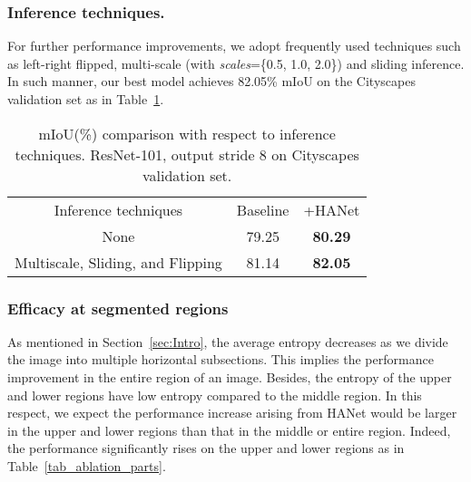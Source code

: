 \documentclass[10pt,twocolumn,letterpaper]{article}
\newcommand{\drule}{\specialrule{0.2pt}{1pt}{1pt}\specialrule{0.2pt}{0pt}{\belowrulesep}}
\begin{document}
\vspace*{-0.1cm}
\subsubsection{Inference techniques.} \label{exp_inference}
\vspace*{-0.2cm}
For further performance improvements, we adopt frequently used techniques such as left-right flipped, multi-scale (with \textit{scales}=\{0.5, 1.0, 2.0\}) and sliding inference.
In such manner, our best model achieves 82.05\% mIoU on the Cityscapes validation set as in Table~\ref{tab_best_model}.

\begin{table}[h]
\vspace*{-0.2cm}
\begin{center}
\footnotesize
\begin{tabular}{c|c|c}
\toprule
Inference techniques & Baseline & +HANet \\
\drule
None & 79.25 & \textbf{80.29} \\ 
\midrule
Multiscale, Sliding, and Flipping & 81.14 & \textbf{82.05} \\
\bottomrule
\end{tabular}
\end{center}
\vspace*{-0.5cm}
\caption{mIoU(\%) comparison with respect to inference techniques. ResNet-101, output stride 8 on Cityscapes validation set.}
\label{tab_best_model}
\vspace*{-0.3cm}
\end{table}












\vspace*{-0.45cm}
\subsubsection{Efficacy at segmented regions}
\vspace*{-0.15cm}
As mentioned in Section~\ref{sec:Intro}, the average entropy decreases as we divide the image into multiple horizontal subsections. This implies the performance improvement in the entire region of an image. 
Besides, the entropy of the upper and lower regions have low entropy compared to the middle region. In this respect, we expect the performance increase arising from HANet would be larger in the upper and lower regions than that in the middle or entire region. Indeed, the performance significantly rises on the upper and lower regions as in Table~\ref{tab_ablation_parts}.
\end{document}
